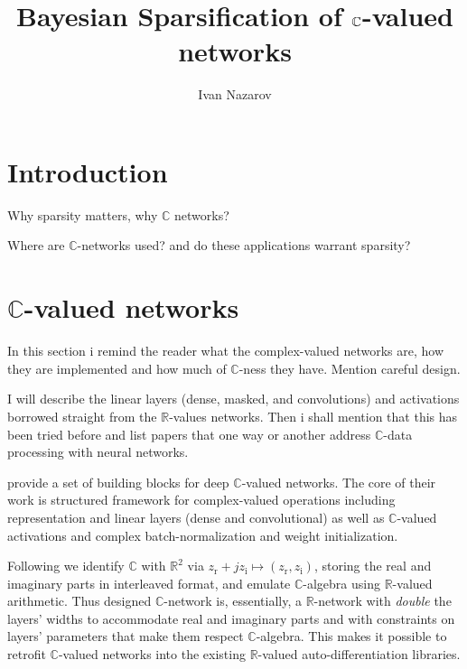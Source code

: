 \documentclass[a4paper,10pt]{article}
\title{Bayesian Sparsification of $\cplx$-valued networks}
\author{Ivan Nazarov}
\newcommand{\real}{\mathbb{R}}
\newcommand{\cplx}{\mathbb{C}}
\begin{document}
\maketitle


\section{Introduction} %
\label{sec:introduction}

Why sparsity matters, why $\cplx$ networks?

Where are $\cplx$-networks used? and do these applications warrant sparsity?


\section{$\cplx$-valued networks} %
\label{sec:c_valued_networks}

In this section i remind the reader what the complex-valued networks are, how
they are implemented and how much of $\cplx$-ness they have. Mention careful
design.

I will describe the linear layers (dense, masked, and convolutions) and
activations borrowed straight from the $\real$-values networks. Then i shall
mention that this has been tried before and list papers that one way or another
address $\cplx$-data processing with neural networks.

\cite{trabelsi_deep_2017} provide a set of building blocks for deep $\cplx$-valued
networks. The core of their work is structured framework for complex-valued operations
including representation and linear layers (dense and convolutional) as well
as $\cplx$-valued activations and complex batch-normalization and weight initialization.

Following \cite{trabelsi_deep_2017} we identify $\cplx$ with $\real^2$ via $
  z_\mathrm{r} + j z_\mathrm{i} \mapsto (z_\mathrm{r}, z_\mathrm{i})
$, storing the real and imaginary parts in interleaved format, and emulate $\cplx$-algebra
using $\real$-valued arithmetic. Thus designed $\cplx$-network is, essentially, a
$\real$-network with \textit{double} the layers' widths to accommodate real and imaginary
parts and with constraints on layers' parameters that make them respect $\cplx$-algebra.
This makes it possible to retrofit $\cplx$-valued networks into the existing $\real$-valued
auto-differentiation libraries.
\end{document}
